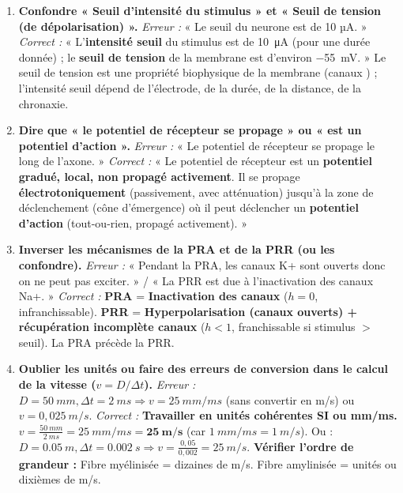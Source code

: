 \documentclass[11pt]{article}
\begin{document}
\begin{attention}
\begin{enumerate}
    \item \textbf{Confondre « Seuil d'intensité du stimulus » et « Seuil de tension (de dépolarisation) ».}
    \textit{Erreur :} « Le seuil du neurone est de 10 µA. »
    \textit{Correct :} « L'\textbf{intensité seuil} du stimulus est de \SI{10}{\micro A} (pour une durée donnée) ; le \textbf{seuil de tension} de la membrane est d'environ \SI{-55}{mV}. » Le seuil de tension est une propriété biophysique de la membrane (canaux ) ; l'intensité seuil dépend de l'électrode, de la durée, de la distance, de la chronaxie.
    
    \item \textbf{Dire que « le potentiel de récepteur se propage » ou « est un potentiel d'action ».}
    \textit{Erreur :} « Le potentiel de récepteur se propage le long de l'axone. »
    \textit{Correct :} « Le potentiel de récepteur est un \textbf{potentiel gradué, local, non propagé activement}. Il se propage \textbf{électrotoniquement} (passivement, avec atténuation) jusqu'à la zone de déclenchement (cône d'émergence) où il peut déclencher un \textbf{potentiel d'action} (tout-ou-rien, propagé activement). »
    
    \item \textbf{Inverser les mécanismes de la PRA et de la PRR (ou les confondre).}
    \textit{Erreur :} « Pendant la PRA, les canaux K+ sont ouverts donc on ne peut pas exciter. » / « La PRR est due à l'inactivation des canaux Na+. »
    \textit{Correct :} \textbf{PRA} = \textbf{Inactivation des canaux } ($h=0$, infranchissable). \textbf{PRR} = \textbf{Hyperpolarisation (canaux  ouverts) + récupération incomplète canaux } ($h < 1$, franchissable si stimulus $>$ seuil). La PRA précède la PRR.
    
    \item \textbf{Oublier les unités ou faire des erreurs de conversion dans le calcul de la vitesse ($v = D/\Delta t$).}
    \textit{Erreur :} $D = \SI{50}{mm}, \Delta t = \SI{2}{ms} \Rightarrow v = 25\ mm/ms$ (sans convertir en m/s) ou $v = 0,025\ m/s$.
    \textit{Correct :} \textbf{Travailler en unités cohérentes SI ou mm/ms.}
    $v = \frac{\SI{50}{mm}}{\SI{2}{ms}} = \SI{25}{mm/ms} = \mathbf{\SI{25}{m/s}}$ (car $1\ mm/ms = 1\ m/s$).
    Ou : $D = \SI{0,05}{m}, \Delta t = \SI{0,002}{s} \Rightarrow v = \frac{0,05}{0,002} = \SI{25}{m/s}$.
    \textbf{Vérifier l'ordre de grandeur :} Fibre myélinisée = dizaines de m/s. Fibre amylinisée = unités ou dixièmes de m/s.
    

\end{enumerate}
\end{attention}
\end{document}

